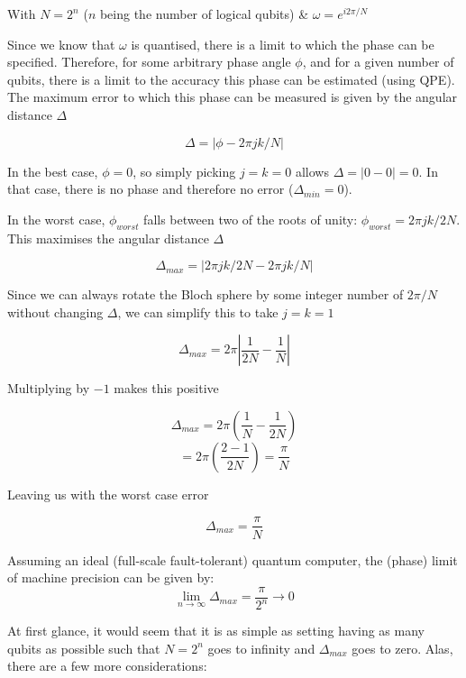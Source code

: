 \documentclass{book}
\begin{document}
With $ N = 2^n$ ($n$ being the number of logical qubits) & $\omega = e^{i2\pi/N}$

Since we know that $\omega$ is quantised, there is a limit to which the phase can be specified. Therefore, for some arbitrary phase angle $\phi$, and for a given number of qubits, there is a limit to the accuracy this phase can be estimated (using QPE). The maximum error to which this phase can be measured is given by the angular distance $\Delta$

$$ \Delta = | \phi - 2\pi jk/N | $$

In the best case, $\phi = 0 $, so simply picking $ j = k = 0 $ allows $\Delta = | 0 - 0 | = 0 $. In that case, there is no phase and therefore no error ($\Delta_{min} = 0$). 

In the worst case, $\phi_{worst}$ falls between two of the roots of unity: $\phi_{worst} = 2\pi jk/2N$. This maximises the angular distance $\Delta$


$$ \Delta_{max} = | 2\pi jk/2N - 2\pi jk/N | $$

Since we can always rotate the Bloch sphere by some integer number of $ 2\pi/N $ without changing $ \Delta $, we can simplify this to take $j = k = 1$

$$ \Delta_{max} = 2\pi \left| \frac{1}{2N} - \frac{1}{N} \right| $$

Multiplying by $-1$ makes this positive

$$ \Delta_{max} = 2\pi\left( \frac{1}{N} - \frac{1}{2N} \right) $$
$$ = 2\pi\left(  \frac{ 2 -1}{2N}   \right) = \frac{\pi}{N} $$

Leaving us with the worst case error 


$$ \Delta_{max} = \frac{\pi}{N} $$

Assuming an ideal (full-scale fault-tolerant) quantum computer, the (phase) limit of machine precision can be given by:
$$
\lim_{n \rightarrow \infty} \Delta_{max} = \frac{\pi}{2^n} \rightarrow 0
$$

At first glance, it would seem that it is as simple as setting having as many qubits as possible such that $N = 2^n$ goes to infinity and $\Delta_{max}$ goes to zero. Alas, there are a few more considerations:
\end{document}
